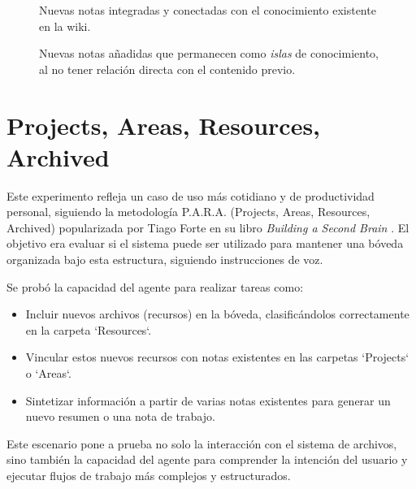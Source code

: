 \begin{figure}[h]
    \centering
    \caption{Nuevas notas integradas y conectadas con el conocimiento existente en la wiki.}
    \label{fig:wiki_cluster}
\end{figure}
\begin{figure}[h]
    \centering
    \caption{Nuevas notas añadidas que permanecen como \textit{islas} de conocimiento, al no tener relación directa con el contenido previo.}
    \label{fig:wiki_isolated}
\end{figure}


\section{Projects, Areas, Resources, Archived}
Este experimento refleja un caso de uso más cotidiano y de productividad personal, siguiendo la metodología P.A.R.A. (Projects, Areas, Resources, Archived) popularizada por Tiago Forte en su libro \textit{Building a Second Brain} \cite{forteBuildingSecondBrain2022}. El objetivo era evaluar si el sistema puede ser utilizado para mantener una bóveda organizada bajo esta estructura, siguiendo instrucciones de voz.

Se probó la capacidad del agente para realizar tareas como:
\begin{itemize}
    \item Incluir nuevos archivos (recursos) en la bóveda, clasificándolos correctamente en la carpeta `Resources`.
    \item Vincular estos nuevos recursos con notas existentes en las carpetas `Projects` o `Areas`.
    \item Sintetizar información a partir de varias notas existentes para generar un nuevo resumen o una nota de trabajo.
\end{itemize}
Este escenario pone a prueba no solo la interacción con el sistema de archivos, sino también la capacidad del agente para comprender la intención del usuario y ejecutar flujos de trabajo más complejos y estructurados.

